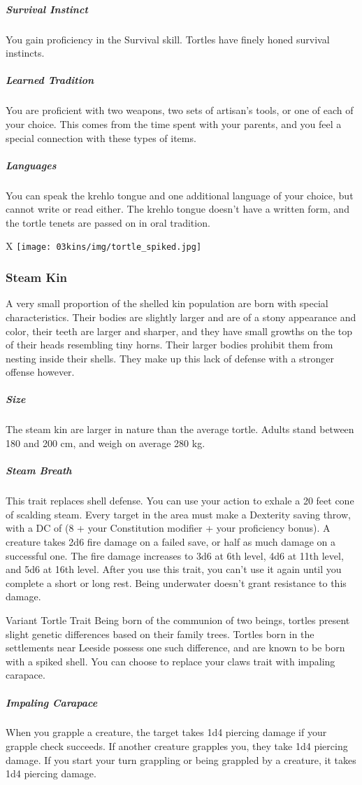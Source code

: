 \begin{linenumbers}
\subparagraph{Survival Instinct} You gain proficiency in the Survival skill.
Tortles have finely honed survival instincts.
\subparagraph{Learned Tradition} You are proficient with two weapons, two sets of artisan's tools, or one of each of your choice.
This comes from the time spent with your parents, and you feel a special connection with these types of items.
\subparagraph{Languages} You can speak the krehlo tongue and one additional language of your choice, but cannot write or read either.
The krehlo tongue doesn't have a written form, and the tortle tenets are passed on in oral tradition.

\begin{table*}[b]%
    \begin{DndTable}[width=\linewidth]{X}
        \texttt{[image: 03kins/img/tortle\_spiked.jpg]}
    \end{DndTable}
\end{table*}

\subsubsection{Steam Kin}
A very small proportion of the shelled kin population are born with special characteristics.
Their bodies are slightly larger and are of a stony appearance and color, their teeth are larger and sharper, and they have small growths on the top of their heads resembling tiny horns.
Their larger bodies prohibit them from nesting inside their shells.
They make up this lack of defense with a stronger offense however.
\subparagraph{Size} The steam kin are larger in nature than the average tortle.
Adults stand between 180 and 200 cm, and weigh on average 280 kg.
\subparagraph{Steam Breath} This trait replaces shell defense.
You can use your action to exhale a 20 feet cone of scalding steam.
Every target in the area must make a Dexterity saving throw, with a DC of (8 + your Constitution modifier + your proficiency bonus).
A creature takes 2d6 fire damage on a failed save, or half as much damage on a successful one.
The fire damage increases to 3d6 at 6th level, 4d6 at 11th level, and 5d6 at 16th level.
After you use this trait, you can't use it again until you complete a short or long rest.
Being underwater doesn't grant resistance to this damage.
\end{linenumbers}

\begin{DndSidebar}[float=!b]{Variant Tortle Trait}
    Being born of the communion of two beings, tortles present slight genetic differences based on their family trees.
    Tortles born in the settlements near Leeside possess one such difference, and are known to be born with a spiked shell.
    You can choose to replace your claws trait with impaling carapace.
    \subparagraph{Impaling Carapace} When you grapple a creature, the target takes 1d4 piercing damage if your grapple check succeeds.
    If another creature grapples you, they take 1d4 piercing damage.
    If you start your turn grappling or being grappled by a creature, it takes 1d4 piercing damage.
\end{DndSidebar}
